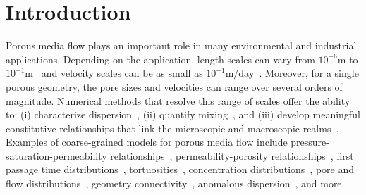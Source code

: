 \documentclass{jfm}
\begin{document}

\maketitle

\section{Introduction}
\label{sec:intro}
Porous media flow plays an important role in many environmental and
industrial applications.  Depending on the application, length scales
can vary from $10^{-6}\mathrm{m}$ to
$10^{-1}\mathrm{m}$~\citep{mil-chr-imh-mcb-ped1998} and velocity scales
can be as small as $10^{-1}\mathrm{m/day}$~\citep{kut-scr-dav-ham1995}.
Moreover, for a single porous geometry, the pore sizes and velocities
can range over several orders of magnitude.  Numerical methods that
resolve this range of scales offer the ability to: (i) characterize
dispersion~\citep{saf1959}, (ii) quantify
mixing~\citep{leb-den-dav-bol-car-dec-bou2011, den-leb-eng-bij2011}, and
(iii) develop meaningful constitutive relationships that link the
microscopic and macroscopic realms~\citep{mil-chr-imh-mcb-ped1998}.
Examples of coarse-grained models for porous media flow include
pressure-saturation-permeability
relationships~\citep{mil-chr-imh-mcb-ped1998}, permeability-porosity
relationships~\citep{dar-mcc1998, car1937, won-kop-tom1984}, first
passage time distributions~\citep{ber-sch-sil2000, hym-den-hag-kan2019,
cve-che-wen1996}, tortuosities~\citep{hak-com-den2019, mat-kha-koz2008,
dud-koz-mat2011, kop-kat-tim1996}, concentration
distributions~\citep{ica-den2019, bel-sal-rin1992}, pore and flow
distributions~\citep{ali-par-wei-bre2017}, geometry
connectivity~\citep{knu-car2005, wes-blo-gra2001}, anomalous
dispersion~\citep{dea-qua-bir-jua2018, den-cor-sch-ber2004,
sie-ili-pri-riv-gua2019}, and more.  
\end{document}
